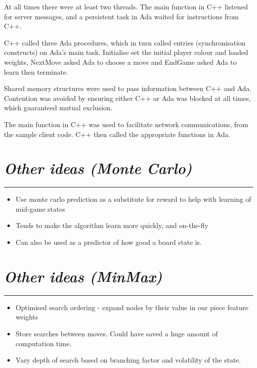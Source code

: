 \documentclass[10pt]{report}
\begin{document}
\begin{multicols}{2}
At all times there were at least two threads. The main function in C++ listened for server messages, and a persistent task in Ada waited for instructions from C++.

C++ called three Ada procedures, which in turn called entries (synchronisation constructs) on Ada's main task. Initialise set the initial player colour and loaded weights, NextMove asked Ada to choose a move and EndGame asked Ada to learn then terminate.

Shared memory structures were used to pass information between C++ and Ada. Contention was avoided by ensuring either C++ or Ada was blocked at all times, which guaranteed mutual exclusion.

The main function in C++ was used to facilitate network communications, from the sample client code. C++ then called the appropriate functions in Ada.

\section*{\emph{Other ideas (Monte Carlo)}}
\hrule
    \begin{itemize}
  \item
    	Use monte carlo prediction as a substitute for reward to help with learning of mid-game states
  \item
	Tends to make the algorithm learn more quickly, and on-the-fly
  \item
	Can also be used as a predictor of how good a board state is.
  \end{itemize}

\section*{\emph{Other ideas (MinMax)}}
\hrule
    \begin{itemize}
  \item
    Optimised search ordering - expand nodes by their value in our piece feature weights
  \item
	Store searches between moves. Could have saved a huge amount of computation time.
  \item
	Vary depth of search based on branching factor and volatility of the state.
  \end{itemize}


\end{multicols}
\end{document}

